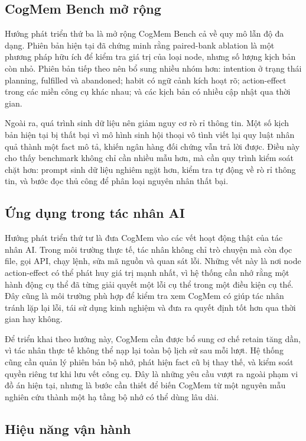 \documentclass[../main.tex]{subfiles}
\begin{document}
\subsection{CogMem Bench mở rộng}

Hướng phát triển thứ ba là mở rộng CogMem Bench cả về quy mô lẫn độ đa dạng. Phiên bản hiện tại đã chứng minh rằng paired-bank ablation là một phương pháp hữu ích để kiểm tra giá trị của loại node, nhưng số lượng kịch bản còn nhỏ. Phiên bản tiếp theo nên bổ sung nhiều nhóm hơn: intention ở trạng thái planning, fulfilled và abandoned; habit có ngữ cảnh kích hoạt rõ; action-effect trong các miền công cụ khác nhau; và các kịch bản có nhiều cập nhật qua thời gian.

Ngoài ra, quá trình sinh dữ liệu nên giảm nguy cơ rò rỉ thông tin. Một số kịch bản hiện tại bị thất bại vì mô hình sinh hội thoại vô tình viết lại quy luật nhân quả thành một fact mô tả, khiến ngân hàng đối chứng vẫn trả lời được. Điều này cho thấy benchmark không chỉ cần nhiều mẫu hơn, mà cần quy trình kiểm soát chặt hơn: prompt sinh dữ liệu nghiêm ngặt hơn, kiểm tra tự động về rò rỉ thông tin, và bước đọc thủ công để phân loại nguyên nhân thất bại.

\subsection{Ứng dụng trong tác nhân AI}

Hướng phát triển thứ tư là đưa CogMem vào các vết hoạt động thật của tác nhân AI. Trong môi trường thực tế, tác nhân không chỉ trò chuyện mà còn đọc file, gọi API, chạy lệnh, sửa mã nguồn và quan sát lỗi. Những vết này là nơi node action-effect có thể phát huy giá trị mạnh nhất, vì hệ thống cần nhớ rằng một hành động cụ thể đã từng giải quyết một lỗi cụ thể trong một điều kiện cụ thể. Đây cũng là môi trường phù hợp để kiểm tra xem CogMem có giúp tác nhân tránh lặp lại lỗi, tái sử dụng kinh nghiệm và đưa ra quyết định tốt hơn qua thời gian hay không.

Để triển khai theo hướng này, CogMem cần được bổ sung cơ chế retain tăng dần, vì tác nhân thực tế không thể nạp lại toàn bộ lịch sử sau mỗi lượt. Hệ thống cũng cần quản lý phiên bản bộ nhớ, phát hiện fact cũ bị thay thế, và kiểm soát quyền riêng tư khi lưu vết công cụ. Đây là những yêu cầu vượt ra ngoài phạm vi đồ án hiện tại, nhưng là bước cần thiết để biến CogMem từ một nguyên mẫu nghiên cứu thành một hạ tầng bộ nhớ có thể dùng lâu dài.

\subsection{Hiệu năng vận hành}
\end{document}
